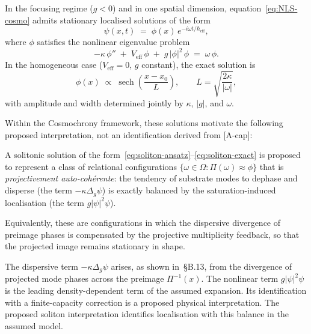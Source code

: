     In the focusing regime ($g < 0$) and in one spatial dimension, equation~\eqref{eq:NLS-cosmo}
    admits stationary localised solutions of the form
    \begin{equation}
      \label{eq:soliton-ansatz}
      \psi(x,t) \;=\; \phi(x)\,e^{-i\omega t/\hbar_{\mathrm{eff}}},
    \end{equation}
    where $\phi$ satisfies the nonlinear eigenvalue problem
    \begin{equation}
      \label{eq:soliton-ode}
      -\kappa\,\phi'' \;+\; V_{\mathrm{eff}}\,\phi \;+\; g\,|\phi|^2\,\phi
      \;=\; \omega\,\phi.
    \end{equation}
    In the homogeneous case ($V_{\mathrm{eff}} = 0$, $g$ constant), the exact solution is
    \begin{equation}
      \label{eq:soliton-exact}
      \phi(x) \;\propto\; \operatorname{sech}\!\!\left(\frac{x - x_0}{L}\right),
      \qquad L = \sqrt{\frac{2\kappa}{|\omega|}},
    \end{equation}
    with amplitude and width determined jointly by $\kappa$, $|g|$, and $\omega$.

    Within the Cosmochrony framework, these solutions motivate the following proposed interpretation,
    not an identification derived from [A-cap]:

    \begin{proposition}
      \label{prop:soliton-cosmo}
      A solitonic solution of the form~\eqref{eq:soliton-ansatz}--\eqref{eq:soliton-exact}
      is proposed to represent a class of relational configurations
      $\{\omega \in \Omega : \Pi(\omega) \approx \phi\}$ that is \emph{projectivement
      auto-cohérente}: the tendency of substrate modes to dephase and disperse (the term
      $-\kappa\Delta_g\psi$) is exactly balanced by the saturation-induced localisation
      (the term $g|\psi|^2\psi$).

      Equivalently, these are configurations in which the dispersive divergence of
      preimage phases is compensated by the projective multiplicity feedback, so that the
      projected image remains stationary in shape.
    \end{proposition}

    The dispersive term $-\kappa\Delta_g\psi$ arises, as shown in~§B.13, from the
    divergence of projected mode phases across the preimage $\Pi^{-1}(x)$.
    The nonlinear term $g|\psi|^2\psi$ is the leading density-dependent term of the assumed expansion.
    Its identification with a finite-capacity correction is a proposed physical interpretation.
    The proposed soliton interpretation identifies localisation with this balance in the assumed model.

